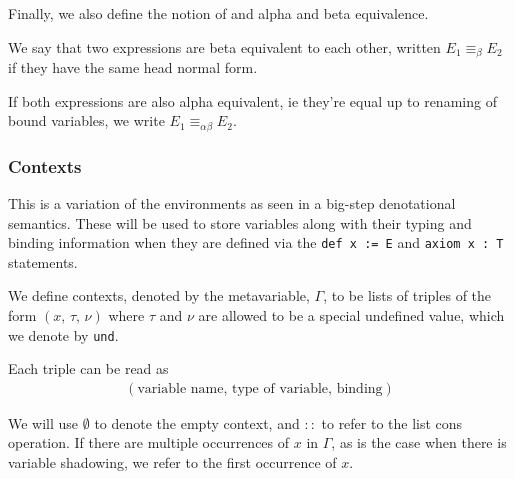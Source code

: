 \documentclass{article}
\begin{document}

Finally, we also define the notion of and alpha and beta equivalence. 

\begin{definition} 
We say that two expressions are beta equivalent to each other, written
$E_1 \equiv_\beta E_2$ if they have the same head normal form.

If both expressions are also alpha equivalent, ie
they're equal up to renaming of bound variables, we write
$E_1 \equiv_{\alpha \beta} E_2$.
\end{definition}


\subsubsection{Contexts}
This is a variation of the environments as seen in a big-step denotational
semantics.
These will be used to store variables along with their typing and binding information
when they are defined via the \texttt{def x := E} and \verb|axiom x : T| statements.

We define contexts, denoted by the metavariable, $\Gamma$, to be lists of
triples of the form $(x, \, \tau, \, \nu)$
where $\tau$ and $\nu$ are allowed to be a special undefined value, which we
denote by \texttt{und}.

Each triple can be read as
\begin{align*}
  (\text{variable name}, \, \text{type of variable}, \, \text{binding})
\end{align*}


We will use $\emptyset$ to denote the empty context, and $::$ to refer to the
list cons operation.
If there are multiple occurrences of $x$ in $\Gamma$,
as is the case when there is variable shadowing, we refer to the first occurrence
of $x$.
\end{document}
